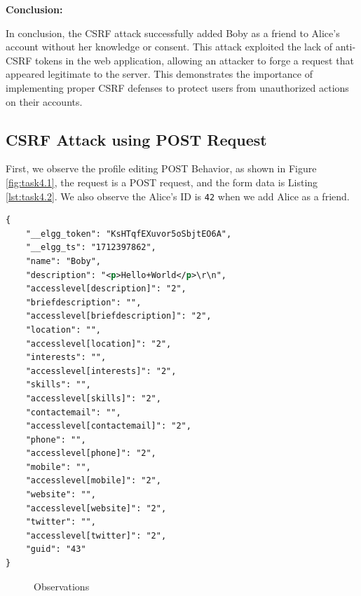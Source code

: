 \documentclass[a4paper,11pt]{article}
\begin{document}
\textbf{Conclusion:}

In conclusion, the CSRF attack successfully added Boby as a friend to Alice's account without her knowledge or consent. This attack exploited the lack of anti-CSRF tokens in the web application, allowing an attacker to forge a request that appeared legitimate to the server. This demonstrates the importance of implementing proper CSRF defenses to protect users from unauthorized actions on their accounts.


\subsection{CSRF Attack using POST Request}
First, we observe the profile editing POST Behavior, as shown in Figure \ref{fig:task4.1}, the request is a POST request, and the form data is Listing \ref{lst:task4.2}. We also observe the Alice's ID is \verb|42| when we add Alice as a friend.

\begin{lstlisting}[caption={POST parameters},label={lst:task4.2},language=XML,breaklines=true]
{
	"__elgg_token": "KsHTqfEXuvor5oSbjtEO6A",
	"__elgg_ts": "1712397862",
	"name": "Boby",
	"description": "<p>Hello+World</p>\r\n",
	"accesslevel[description]": "2",
	"briefdescription": "",
	"accesslevel[briefdescription]": "2",
	"location": "",
	"accesslevel[location]": "2",
	"interests": "",
	"accesslevel[interests]": "2",
	"skills": "",
	"accesslevel[skills]": "2",
	"contactemail": "",
	"accesslevel[contactemail]": "2",
	"phone": "",
	"accesslevel[phone]": "2",
	"mobile": "",
	"accesslevel[mobile]": "2",
	"website": "",
	"accesslevel[website]": "2",
	"twitter": "",
	"accesslevel[twitter]": "2",
	"guid": "43"
}
\end{lstlisting}

\begin{figure}[h]
    \centering
    \hfill
    \hfill
    \caption{Observations}\label{fig:task4}
\end{figure}
\end{document}
